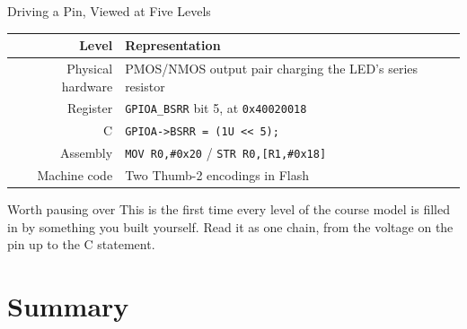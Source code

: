 \documentclass[9pt,aspectratio=169,xcolor=table]{beamer}
\begin{document}
\begin{frame}{Driving a Pin, Viewed at Five Levels}
    \begin{center}
    {\small
    \striped
    \begin{tabular}{@{}r R{.62\textwidth}@{}}
        \toprule
        \textbf{Level} & \textbf{Representation} \\
        \midrule
        Physical hardware & PMOS/NMOS output pair charging the LED's series resistor \\
        Register & \texttt{GPIOA\_BSRR} bit 5, at \texttt{0x40020018} \\
        C & \texttt{GPIOA->BSRR = (1U <{}< 5);} \\
        Assembly & \texttt{MOV R0,\#0x20} / \texttt{STR R0,[R1,\#0x18]} \\
        Machine code & Two Thumb-2 encodings in Flash \\
        \bottomrule
    \end{tabular}}
    \end{center}

    \vspace{3mm}
    \begin{block}{Worth pausing over}
        This is the first time \alert{every level} of the course model is filled in by something you built yourself. Read it as one chain, from the voltage on the pin up to the C statement.
    \end{block}
\end{frame}


\section{Summary}
\end{document}
